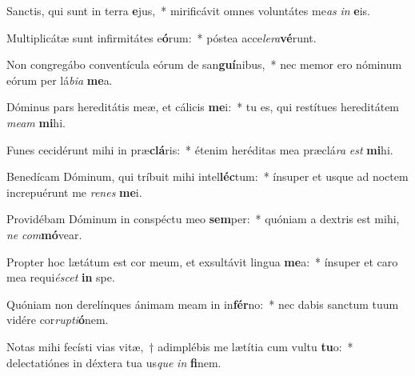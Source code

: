 \item Sanctis, qui sunt in terra \textbf{e}jus,~* mirificávit omnes voluntátes me\textit{as} \textit{in} \textbf{e}is.
\item Multiplicátæ sunt infirmitátes e\textbf{ó}rum:~* póstea acce\textit{le}\textit{ra}\textbf{vé}runt.
\item Non congregábo conventícula eórum de san\textbf{guí}nibus,~* nec memor ero nóminum eórum per lá\textit{bi}\textit{a} \textbf{me}a.
\item Dóminus pars hereditátis meæ, et cálicis \textbf{me}i:~* tu es, qui restítues hereditátem \textit{me}\textit{am} \textbf{mi}hi.
\item Funes cecidérunt mihi in præ\textbf{clá}ris:~* étenim heréditas mea præclá\textit{ra} \textit{est} \textbf{mi}hi.
\item Benedícam Dóminum, qui tríbuit mihi intel\textbf{léc}tum:~* ínsuper et usque ad noctem increpuérunt me \textit{re}\textit{nes} \textbf{me}i.
\item Providébam Dóminum in conspéctu meo \textbf{sem}per:~* quóniam a dextris est mihi, \textit{ne} \textit{com}\textbf{mó}vear.
\item Propter hoc lætátum est cor meum, et exsultávit lingua \textbf{me}a:~* ínsuper et caro mea requi\textit{é}\textit{scet} \textbf{in} spe.
\item Quóniam non derelínques ánimam meam in in\textbf{fér}no:~* nec dabis sanctum tuum vidére cor\textit{rup}\textit{ti}\textbf{ó}nem.
\item Notas mihi fecísti vias vitæ,~† adimplébis me lætítia cum vultu \textbf{tu}o:~* delectatiónes in déxtera tua us\textit{que} \textit{in} \textbf{fi}nem.
